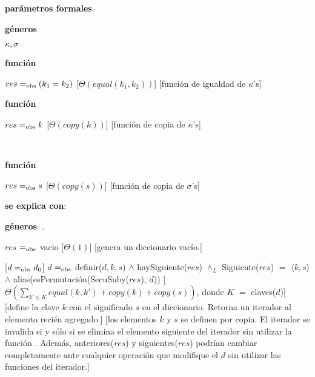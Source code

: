 \documentclass[a4paper,10pt]{article}
\begin{document}
\begin{Interfaz}

  \textbf{parámetros formales}\parindent\\
  \parbox{1.7cm}{\textbf{géneros}}$\kappa,\sigma$\\
  \parbox[t]{1.7cm}{\textbf{función}}\parbox[t]{.5\textwidth-\parindent-1.7cm}{%
    {$res =_{\mathrm{obs}} (k_1 = k_2)$}
    [$\Theta(equal(k_1, k_2))$]
    [función de igualdad de $\kappa$'s]
  }%
  \parbox[t]{1.7cm}{\textbf{función}}\parbox[t]{.5\textwidth-\parindent-1.7cm}{%
    {$res =_{\mathrm{obs}} k$}
    [$\Theta(copy(k))$]
    [función de copia de $\kappa$'s]
  }\\[2ex]
  \parbox[t]{1.7cm}{\textbf{función}}\parbox[t]{.5\textwidth-\parindent-1.7cm}{%
    {$res =_{\mathrm{obs}} s$}
    [$\Theta(copy(s))$]
    [función de copia de $\sigma$'s]
  }

  \textbf{se explica con}: 

  \textbf{géneros}: .


  {$res$ $=_{\mathrm{obs}}$ vacio}%
  [$\Theta(1)$]
  [genera un diccionario vacío.]

  [$d =_{\mathrm{obs}} d_0$]
  {$d$ $=_{\mathrm{obs}}$ definir($d, k, s$) $\land$ haySiguiente($res$) $\land_L$ Siguiente($res$) $=$ $\langle k,s\rangle$ $\land$ alias(esPermutación(SecuSuby($res$), $d$))}
  [$\displaystyle\Theta\left(\sum_{k' \in K}equal(k,k') + copy(k) + copy(s)\right)$, donde $K$ $=$ claves($d$)]
  [define la clave $k$ con el significado $s$ en el diccionario.  Retorna un iterador al elemento recién agregado.]
  [los elementos $k$ y $s$ se definen por copia.  El iterador se invalida si y sólo si se elimina el elemento siguiente del iterador sin utilizar la función . Además, anteriores($res$) y siguientes($res$) podrían cambiar completamente ante cualquier operación que modifique el $d$ sin utilizar las funciones del iterador.]



\end{Interfaz}
\end{document}
